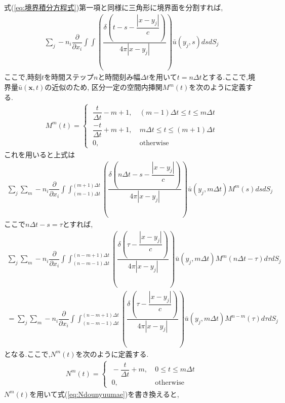 \documentclass[dvipdfmx]{ampbt}
\begin{document}
式(\ref{eq:境界積分方程式})第一項と同様に三角形に境界面を分割すれば,
\begin{align}
\sum_j -n_i\dfrac{\partial}{\partial x_i}\int\!\!\!\int \left( \dfrac{\delta(t-s-\dfrac{|x-y_j|}{c})}{4\pi|x-y_j|} \right) \bar{u}(y_j,s) ds dS_j
\end{align}
ここで,時刻$t$を時間ステップ$n$と時間刻み幅$\Delta t$を用いて$t=n\Delta t$とする.ここで,境界量$\bar{u}(\bm{x},t)$の近似のため,
区分一定の空間内挿関$M^m(t)$を次のように定義する.
\begin{align}
  M^m(t) =
\begin{cases}
\; \dfrac{t}{\Delta t}-m+1,&\ (m-1)\Delta t \leq t \leq m\Delta t  \\
\; \dfrac{-t}{\Delta t}+m+1,&\ m\Delta t \leq t \leq (m+1)\Delta t  \\
\; 0, &\ \mbox{otherwise}
\end{cases}
\end{align}
これを用いると上式は
\begin{align}
\sum_j \sum_m -n_i\dfrac{\partial}{\partial x_i}\int\!\!\!\int_{(m-1)\Delta t }^{(m+1)\Delta t} \left( \dfrac{\delta(n\Delta t-s-\dfrac{|x-y_j|}{c})}{4\pi|x-y_j|} \right) \bar{u}(y_j,m\Delta t)M^m(s)dsdS_j
\end{align}
ここで$n\Delta t-s = \tau$とすれば,
\begin{align}
\sum_j \sum_m -n_i\dfrac{\partial}{\partial x_i}\int\!\!\!\int_{(n-m-1)\Delta t }^{(n-m+1)\Delta t} \left( \dfrac{\delta(\tau- \dfrac{|x-y_j|}{c})}{4\pi|x-y_j|} \right) \bar{u}(y_j,m\Delta t)M^m(n\Delta t - \tau)d\tau dS_j \nonumber \\
\label{eq:Ndounyuumae}
= \sum_j \sum_m -n_i\dfrac{\partial}{\partial x_i}\int\!\!\!\int_{(n-m-1)\Delta t }^{(n-m+1)\Delta t} \left( \dfrac{\delta(\tau- \dfrac{|x-y_j|}{c})}{4\pi|x-y_j|} \right) \bar{u}(y_j,m\Delta t)M^{n-m}(\tau)d\tau dS_j
\end{align}
となる.ここで,$N^m(t)$を次のように定義する.
\begin{align}
  N^m(t) =
\begin{cases}
\; -\dfrac{t}{\Delta t}+m,&\ 0 \leq t \leq m\Delta t  \\
\; 0, &\ \mbox{otherwise}
\end{cases}
\end{align}
$N^m(t)$を用いて式(\ref{eq:Ndounyuumae})を書き換えると,
\end{document}
